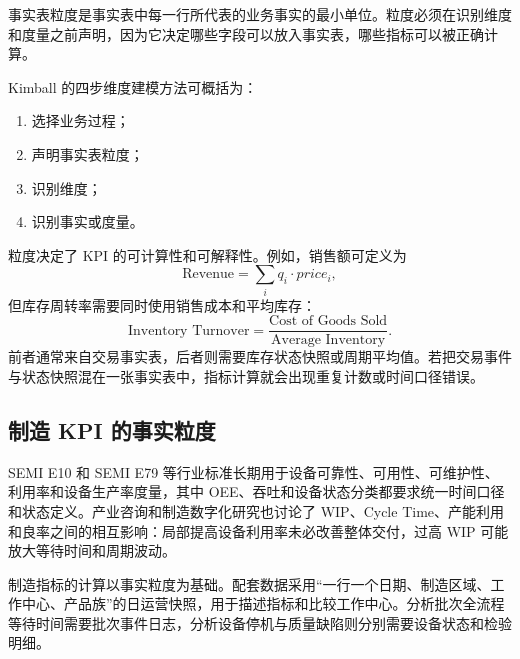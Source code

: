 \begin{definition}[事实表粒度]
事实表粒度是事实表中每一行所代表的业务事实的最小单位。粒度必须在识别维度和度量之前声明，因为它决定哪些字段可以放入事实表，哪些指标可以被正确计算。
\end{definition}

Kimball 的四步维度建模方法可概括为：
\begin{enumerate}
  \item 选择业务过程；
  \item 声明事实表粒度；
  \item 识别维度；
  \item 识别事实或度量。
\end{enumerate}

粒度决定了 KPI 的可计算性和可解释性。例如，销售额可定义为
\[
\text{Revenue}=\sum_i q_i\cdot price_i,
\]
但库存周转率需要同时使用销售成本和平均库存：
\[
\text{Inventory Turnover}
=
\frac{\text{Cost of Goods Sold}}{\text{Average Inventory}}.
\]
前者通常来自交易事实表，后者则需要库存状态快照或周期平均值。若把交易事件与状态快照混在一张事实表中，指标计算就会出现重复计数或时间口径错误。

\subsection{制造 KPI 的事实粒度}

SEMI E10 和 SEMI E79 等行业标准长期用于设备可靠性、可用性、可维护性、利用率和设备生产率度量，其中 OEE、吞吐和设备状态分类都要求统一时间口径和状态定义\cite{semi03}。产业咨询和制造数字化研究也讨论了 WIP、Cycle Time、产能利用和良率之间的相互影响：局部提高设备利用率未必改善整体交付，过高 WIP 可能放大等待时间和周期波动\cite{mckinsey2024fab,mckinsey2024backend}。

制造指标的计算以事实粒度为基础。配套数据采用“一行一个日期、制造区域、工作中心、产品族”的日运营快照，用于描述指标和比较工作中心。分析批次全流程等待时间需要批次事件日志，分析设备停机与质量缺陷则分别需要设备状态和检验明细。

